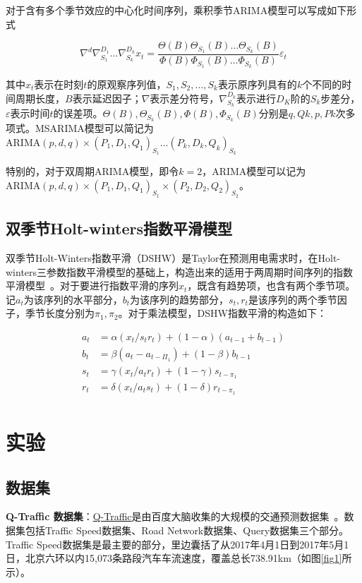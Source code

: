 \documentclass[lang=cn,11pt,a4paper]{elegantpaper}
\begin{document}
对于含有多个季节效应的中心化时间序列，乘积季节ARIMA模型可以写成如下形式

\begin{equation}
\nabla^d\nabla_{S_1}^{D_1}\ldots\nabla_{S_k}^{D_k}x_t=\frac{\Theta(B)\Theta_{S_1}(B)\ldots\Theta_{S_k}(B)}{\Phi(B)\Phi_{S_1}(B)\ldots\Phi_{S_k}(B)}\varepsilon_t
\end{equation}

其中$x_t$表示在时刻$t$的原观察序列值，$S_1,S_2,\ldots,S_k$表示原序列具有的$k$个不同的时间周期长度，$B$表示延迟因子；$\nabla$表示差分符号，$\nabla_{S_k}^{D_k}$表示进行$D_K$阶的$S_k$步差分，$\varepsilon$表示时间$t$的误差项。$\Theta(B),\Theta_{S_k}(B),\Phi(B),\Phi_{S_k}(B)$分别是$q,Qk,p,Pk$次多项式。MSARIMA模型可以简记为$\mathrm{ARIMA}(p,d,q)\times(P_1,D_1,Q_1)_{S_1}\ldots(P_k,D_k,Q_k)_{S_k}$

特别的，对于双周期ARIMA模型，即令$k=2$，ARIMA模型可以记为$\mathrm{ARIMA}(p,d,q)\times(P_1,D_1,Q_1)_{S_1}\times(P_2,D_2,Q_2)_{S_2}$。

\subsection{双季节Holt-winters指数平滑模型}
双季节Holt-Winters指数平滑（DSHW）是Taylor在预测用电需求时，在Holt-winters三参数指数平滑模型的基础上，构造出来的适用于两周期时间序列的指数平滑模型~\cite{taylor2006comparison}。对于要进行指数平滑的序列${x_t}$，既含有趋势项，也含有两个季节项。记$a_t$为该序列的水平部分，$b_t$为该序列的趋势部分，$s_t,r_t$是该序列的两个季节因子，季节长度分别为$\pi_1,\pi_2$。对于乘法模型，DSHW指数平滑的构造如下：

\begin{equation}
\begin{aligned}
a_t&=\alpha(x_t/s_tr_t)+(1-\alpha)(a_{t-1}+b_{t-1})\\
b_t&=\beta(a_t-a_{t-\Pi_1})+(1-\beta)b_{t-1}\\
s_t&=\gamma(x_t/a_tr_t)+(1-\gamma)s_{t-\pi_1}\\
r_t&=\delta(x_t/a_ts_t)+(1-\delta)r_{t-\pi_1}\\
\end{aligned}
\end{equation}


\section{实验}
\subsection{数据集}
\textbf{Q-Traffic 数据集}：\href{https://ai.baidu.com/broad/introduction?dataset=traffic}{Q-Traffic}是由百度大脑收集的大规模的交通预测数据集~\cite{bbliaojqZhangKDD18deep}。数据集包括Traffic Speed数据集、Road Network数据集、Query数据集三个部分。Traffic Speed数据集是最主要的部分，里边囊括了从2017年4月1日到2017年5月1日，北京六环以内15,073条路段汽车车流速度，覆盖总长738.91km（如图\ref{fig1}所示）。
\end{document}
